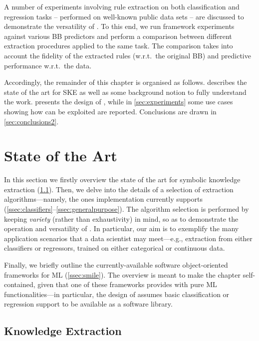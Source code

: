 \documentclass[12pt,a4paper,openright,twoside]{book}
\begin{document}
A number of experiments involving rule extraction on both classification and regression tasks -- performed on well-known public data sets -- are discussed to demonstrate the versatility of \psyke{}.
%
To this end, we run framework experiments against various BB predictors and perform a comparison between different extraction procedures applied to the same task.
%
The comparison takes into account the fidelity of the extracted rules (w.r.t.\ the original BB) and predictive performance w.r.t.\ the data.

Accordingly, the remainder of this chapter is organised as follows.
%
 describes the state of the art for SKE as well as some background notion to fully understand the work.
%
 presents the design of \psyke{}, while in \cref{sec:experiments} some use cases showing how \psyke{} can be exploited are reported.
%
Conclusions are drawn in \cref{sec:conclusions2}.

\section{State of the Art}\label{sec:state}

In this section we firstly overview the state of the art for symbolic knowledge extraction (\cref{ssec:extraction}).
%
Then, we delve into the details of a selection of extraction algorithms---namely, the ones \psyke{} implementation currently supports (\cref{ssec:classifiers}--\cref{ssec:generalpurpose}).
%
The algorithm selection is performed by keeping \emph{variety} (rather than exhaustivity) in mind, so as to demonstrate the operation and versatility of \psyke{}.
%
In particular, our aim is to exemplify the many application scenarios that a data scientist may meet---e.g., extraction from either classifiers or regressors, trained on either categorical or continuous data.

Finally, we briefly outline the currently-available software object-oriented frameworks for ML  (\cref{ssec:smile}).
%
The overview is meant to make the chapter self-contained, given that one of these frameworks provides \psyke{} with pure ML functionalities---in particular, the design of \psyke{} assumes basic classification or regression support to be available as a software library.

\subsection{Knowledge Extraction}\label{ssec:extraction}
\end{document}
